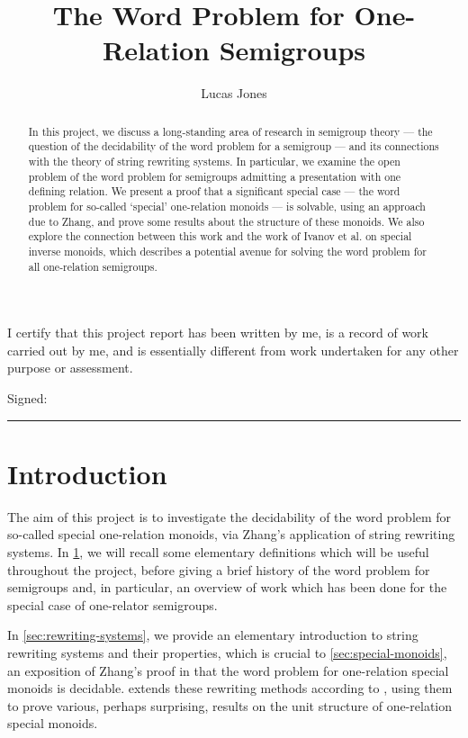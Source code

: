 \documentclass[noindex,noinsetproof,12pt]{lmaths}
\title{The Word Problem for One-Relation Semigroups}
\author{Lucas Jones}
\newcommand{\frontmatter}{\pagenumbering{roman}}
\newcommand{\mainmatter}{\pagenumbering{arabic}}
\begin{document}
\vfill
\maketitle
\vfill
\thispagestyle{empty}
\clearpage

\frontmatter
I certify that this project report has been written by me, is a record of work carried out by me, and is essentially different from work undertaken for any other purpose or assessment.

\vspace{1.5em}
Signed: \rule[-2pt]{15em}{1pt}
\clearpage

\begin{abstract}
	In this project, we discuss a long-standing area of research in semigroup theory --- the question of the decidability of the word problem for a semigroup --- and its connections with the theory of string rewriting systems. In particular, we examine the open problem of the word problem for semigroups admitting a presentation with one defining relation. We present a proof that a significant special case --- the word problem for so-called `special' one-relation monoids --- is solvable, using an approach due to Zhang, and prove some results about the structure of these monoids. We also explore the connection between this work and the work of Ivanov et al. on special inverse monoids, which describes a potential avenue for solving the word problem for all one-relation semigroups.
\end{abstract}

\tableofcontents

\clearpage

\mainmatter
\section{Introduction} \label{sec:intro}

The aim of this project is to investigate the decidability of the word problem for so-called special one-relation monoids, via Zhang's application of string rewriting systems. In \cref{sec:intro}, we will recall some elementary definitions which will be useful throughout the project, before giving a brief history of the word problem for semigroups and, in particular, an overview of work which has been done for the special case of one-relator semigroups.

In \cref{sec:rewriting-systems}, we provide an elementary introduction to string rewriting systems and their properties, which is crucial to \cref{sec:special-monoids}, an exposition of Zhang's proof in \cite{Zhang1992a} that the word problem for one-relation special monoids is decidable.  extends these rewriting methods according to \cite{Zhang1992}, using them to prove various, perhaps surprising, results on the unit structure of one-relation special monoids.
\end{document}
